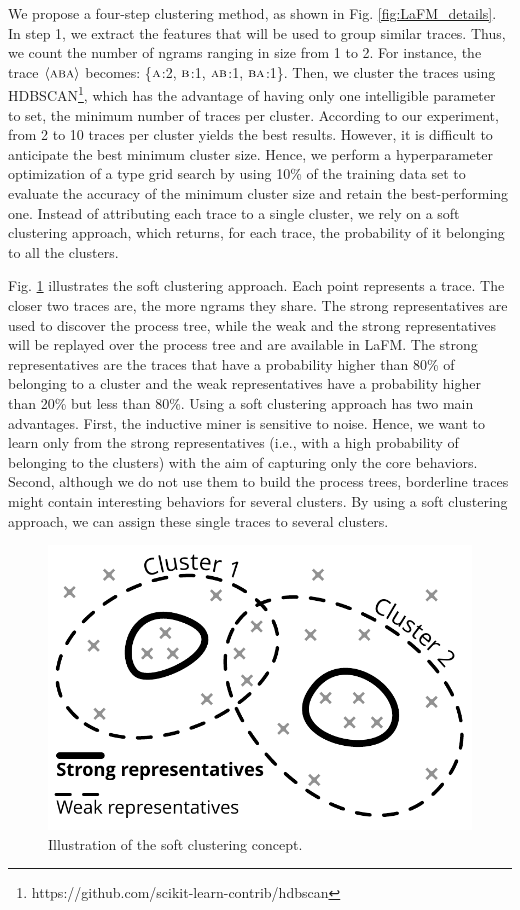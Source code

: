 \documentclass[runningheads]{llncs}
\begin{document}
We propose a four-step clustering method, as shown in Fig. \ref{fig:LaFM_details}. In step 1, we extract the features that will be used to group similar traces. Thus, we count the number of ngrams ranging in size from 1 to 2. For instance, the trace $\langle \textsc{aba} \rangle$ becomes: \{$\textsc{a}$:2, $\textsc{b}$:1, $\textsc{ab}$:1, $\textsc{ba}$:1\}. Then, we cluster the traces using HDBSCAN\footnote{https://github.com/scikit-learn-contrib/hdbscan}, which has the advantage of having only one intelligible parameter to set, the minimum number of traces per cluster. According to our experiment, from 2 to 10 traces per cluster yields the best results. However, it is difficult to anticipate the best minimum cluster size. Hence, we perform a hyperparameter optimization of a type grid search by using 10\% of the training data set to evaluate the accuracy of the minimum cluster size and retain the best-performing one. Instead of attributing each trace to a single cluster, we rely on a soft clustering approach, which returns, for each trace, the probability of it belonging to all the clusters. 



Fig. \ref{fig:soft_clustering} illustrates the soft clustering approach. Each point represents a trace. The closer two traces are, the more ngrams they share. The strong representatives are used to discover the process tree, while the weak and the strong representatives will be replayed over the process tree and are available in LaFM. The strong representatives are the traces that have a probability higher than 80\% of belonging to a cluster and the weak representatives have a probability higher than 20\% but less than 80\%. Using a soft clustering approach has two main advantages. First, the inductive miner is sensitive to noise. Hence, we want to learn only from the strong representatives (i.e., with a high probability of belonging to the clusters) with the aim of capturing only the core behaviors. Second, although we do not use them to build the process trees, borderline traces might contain interesting behaviors for several clusters. By using a soft clustering approach, we can assign these single traces to several clusters.

\begin{figure}
\begin{center}
\vspace{-20pt}
\includegraphics[width=.40\columnwidth]{02-schema/BPMN-cFM.pdf}
\end{center}
\vspace{-15pt}
\caption{Illustration of the soft clustering concept. }
\vspace{-10pt}
\label{fig:soft_clustering}
\end{figure}
\end{document}
